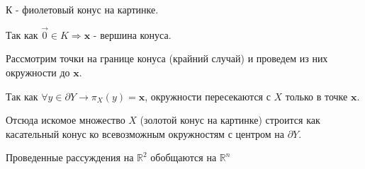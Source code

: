 \documentclass[a4paper,12pt]{article}
\begin{document}
\vspace{\baselineskip}

$К$ - фиолетовый конус на картинке.

Так как $\vec{0} \in K \Rightarrow \mathbf{x}$ - вершина конуса.

Рассмотрим точки на границе конуса (крайний случай) и проведем из них окружности до $\mathbf{x}$.

Так как $\forall y \in \partial Y \rightarrow \pi_X(y) = \mathbf{x}$, окружности пересекаются с $X$ только в точке $\mathbf{x}$.

Отсюда искомое множество $X$ (золотой конус на картинке) строится как касательный конус ко всевозможным окружностям с центром на $\partial Y$.

Проведенные рассуждения на $\mathbb{R}^2$ обобщаются на $\mathbb{R}^n$
\end{document}
